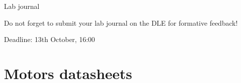 \documentclass[compress]{beamer}
\makeatletter
\let\beamer@writeslidentry@miniframeson=\beamer@writeslidentry
\newcommand*{\miniframeson}{\let\beamer@writeslidentry=\beamer@writeslidentry@miniframeson}
\makeatother
\begin{document}
\begin{frame}{Lab journal}

    \begin{center}
    \Large
    Do not forget to submit your lab journal on the DLE for formative feedback!

    \normalsize
    Deadline: 13th October, 16:00
    \end{center}

\end{frame}
\miniframeson


\section[Datasheets]{Motors datasheets}
\end{document}
